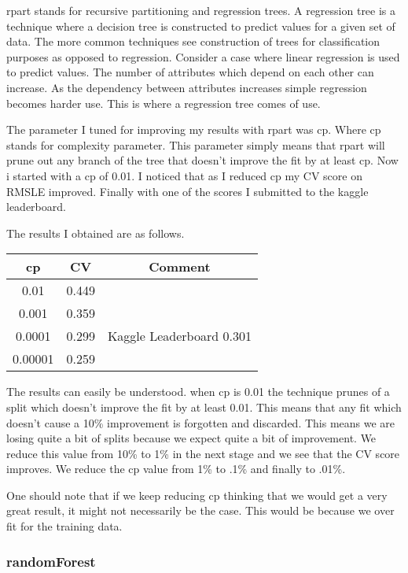 \documentclass[paper=a4, fontsize=11pt]{scrartcl}	%
\numberwithin{equation}{section}		%
\numberwithin{figure}{section}			%
\numberwithin{table}{section}				%
\begin{document}
rpart stands for recursive partitioning and regression trees. A regression tree is a technique where a decision tree is constructed to predict values for a given set of data. The more common techniques see construction of trees for classification purposes as opposed to regression. Consider a case where linear regression is used to predict values. The number of attributes which depend on each other can increase. As the dependency between attributes increases simple regression becomes harder use. This is where a regression tree comes of use. 

The parameter I tuned for improving my results with rpart was cp. Where cp stands for complexity parameter. This parameter simply means that rpart will prune out any branch of the tree that doesn't improve the fit by at least cp. Now i started with a cp of 0.01. I noticed that as I reduced cp my CV score on RMSLE improved. Finally with one of the scores I submitted to the kaggle leaderboard.

The results I obtained are as follows.

\begin{center} \begin{tabular}[h]{|c|c|c|}
\hline
cp & CV & Comment \\ \hline
0.01 & 0.449 & \\
0.001 & 0.359 & \\
0.0001 & 0.299 & Kaggle Leaderboard 0.301 \\
0.00001 & 0.259 & \\ \hline
\end{tabular} \end{center}

The results can easily be understood. when cp is 0.01 the technique prunes of a split which doesn't improve the fit by at least 0.01. This means that any fit which doesn't cause a 10\% improvement is forgotten and discarded. This means we are losing quite a bit of splits because we expect quite a bit of improvement. We reduce this value from 10\% to 1\% in the next stage and we see that the CV score improves. We reduce the cp value from 1\% to .1\% and finally to .01\%.

One should note that if we keep reducing cp thinking that we would get a very great result, it might not necessarily be the case. This would be because we over fit for the training data.

\subsubsection{randomForest}
\end{document}
